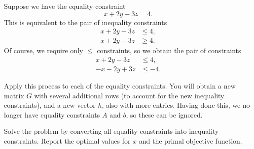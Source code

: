  Suppose we have the equality constraint
\[
x + 2y - 3z = 4.
\]
This is equivalent to the pair of inequality
constraints
\begin{align*}
x + 2y - 3z &\leq 4, \\
x + 2y - 3z &\geq 4.
\end{align*}
Of course, we require only $\leq$ constraints, so we obtain the pair
of constraints
\begin{align*}
x + 2y - 3z &\leq 4, \\
-x - 2y + 3z &\leq -4.
\end{align*}

Apply this process to each of the equality constraints. You will obtain a new matrix $G$ with several additional rows (to account for the new inequality
constraints), and a new vector $h$, also with more entries. Having done this, we no longer have equality constraints $A$ and $b$, so these can be ignored.
\begin{problem}
Solve the problem by converting all equality constraints into inequality constraints.
Report the optimal values for $x$ and the primal objective function.
\end{problem}

